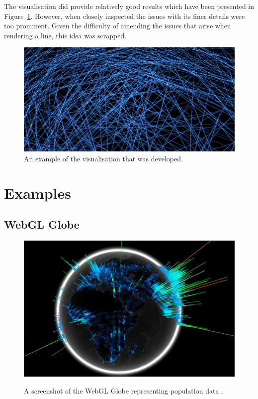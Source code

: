 \documentclass[a4paper]{article}
\begin{document}
\begin{appendices}
{			The visualisation did provide relatively good results which have been presented in Figure~\ref{fig:proof_of_concept}. However, when closely inspected the issues with its finer details were too prominent. Given the difficulty of amending the issues that arise when rendering a line, this idea was scrapped.
			
			\begin{figure}[H]
        		\includegraphics[width=\textwidth]{images/proof-of-concept}
				\caption{An example of the visualisation that was developed.}
				\label{fig:proof_of_concept}
			\end{figure}
		
		}
		
		\newpage
	
		\section{Examples} {
		\label{app:examples}
		
			\subsection{WebGL Globe} {
			\label{app:globe}
		
				\begin{figure}[H]
        			\href{https://www.chromeexperiments.com/globe}{\includegraphics[width=\textwidth]{images/globe}}
					\caption{A screenshot of the WebGL Globe representing population data \citep{google2011globe}.}
					\label{fig:webgl_globe}
				\end{figure}
		
}}
\end{appendices}
\end{document}
